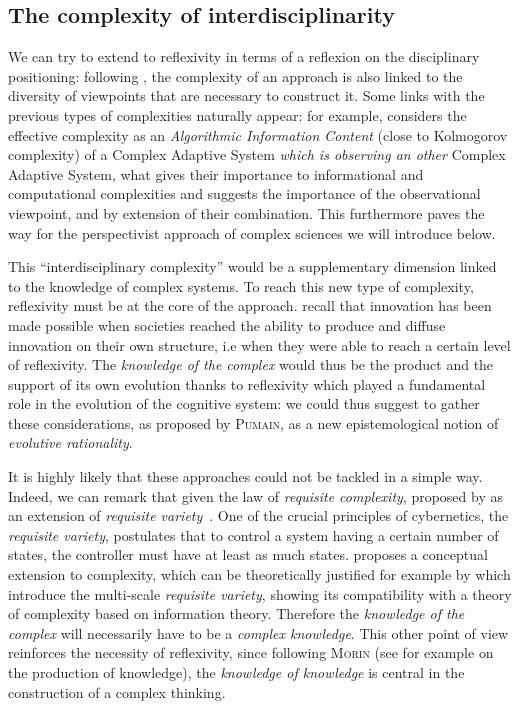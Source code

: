 \documentclass[graybox]{svmult}
\newcommand{\noun}[1]{\textsc{#1}}
\begin{document}
\subsection{The complexity of interdisciplinarity}


We can try to extend to reflexivity in terms of a reflexion on the disciplinary positioning: following \cite{pumain2005cumulativite}, the complexity of an approach is also linked to the diversity of viewpoints that are necessary to construct it. Some links with the previous types of complexities naturally appear: for example, \cite{gell1995quark} considers the effective complexity as an \emph{Algorithmic Information Content} (close to Kolmogorov complexity) of a Complex Adaptive System \emph{which is observing an other} Complex Adaptive System, what gives their importance to informational and computational complexities and suggests the importance of the observational viewpoint, and by extension of their combination. This furthermore paves the way for the perspectivist approach of complex sciences we will introduce below. 

This ``interdisciplinary complexity'' would be a supplementary dimension linked to the knowledge of complex systems. To reach this new type of complexity, reflexivity must be at the core of the approach. \cite{read2009innovation} recall that innovation has been made possible when societies reached the ability to produce and diffuse innovation on their own structure, i.e when they were able to reach a certain level of reflexivity. The \emph{knowledge of the complex} would thus be the product and the support of its own evolution thanks to reflexivity which played a fundamental role in the evolution of the cognitive system: we could thus suggest to gather these considerations, as proposed by \noun{Pumain}, as a new epistemological notion of \emph{evolutive rationality}.


It is highly likely that these approaches could not be tackled in a simple way. Indeed, we can remark that given the law of \emph{requisite complexity}, proposed by \cite{gershenson2015requisite} as an extension of \emph{requisite variety}~\cite{ashby1991requisite}. One of the crucial principles of cybernetics, the \emph{requisite variety}, postulates that to control a system having a certain number of states, the controller must have at least as much states. \cite{gershenson2015requisite} proposes a conceptual extension to complexity, which can be theoretically justified for example by \cite{allen2017multiscale} which introduce the multi-scale \emph{requisite variety}, showing its compatibility with a theory of complexity based on information theory. Therefore the \emph{knowledge of the complex} will necessarily have to be a \emph{complex knowledge}. This other point of view reinforces the necessity of reflexivity, since following \noun{Morin} (see for example \cite{morin1991methode} on the production of knowledge), the \emph{knowledge of knowledge} is central in the construction of a complex thinking.
\end{document}
